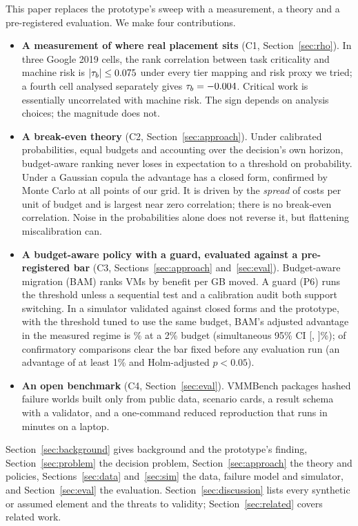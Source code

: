 This paper replaces the prototype's sweep with a measurement, a theory and a pre-registered
evaluation. We make four contributions.

\begin{itemize}
  \item \textbf{A measurement of where real placement sits} (C1, Section~\ref{sec:rho}). In three
  Google 2019 cells, the rank correlation between task criticality and machine risk is
  $|\tau_b| \le 0.075$ under every tier mapping and risk proxy we tried; a fourth
  cell analysed separately gives $\tau_b = -0.004$. Critical work is essentially uncorrelated
  with machine risk. The sign depends on analysis choices; the magnitude does not.

  \item \textbf{A break-even theory} (C2, Section~\ref{sec:approach}). Under calibrated
  probabilities, equal budgets and accounting over the decision's own horizon, budget-aware
  ranking never loses in expectation to a threshold on probability. Under a Gaussian copula the
  advantage has a closed form, confirmed by Monte Carlo at all \VTheoryPoints{} points of our
  grid. It is driven by the \emph{spread} of costs per unit of budget and is largest near zero
  correlation; there is no break-even correlation. Noise in the probabilities alone does not
  reverse it, but flattening miscalibration can.

  \item \textbf{A budget-aware policy with a guard, evaluated against a pre-registered bar}
  (C3, Sections~\ref{sec:approach} and~\ref{sec:eval}). Budget-aware migration (BAM) ranks VMs
  by benefit per GB moved. A guard (P6) runs the threshold unless a sequential test and a
  calibration audit both support switching. In a simulator validated against closed forms and the
  prototype, with the threshold tuned to use the same budget, BAM's adjusted advantage in the
  measured regime is \VDeltaPFourBOneTwo\% at a 2\% budget (simultaneous 95\% CI
  [\VCILoPFourBOneTwo, \VCIHiPFourBOneTwo]\%); \VWins{} of \VFamilySize{} confirmatory comparisons
  clear the bar fixed before any evaluation run (an advantage of at least 1\% and Holm-adjusted
  $p < 0.05$).

  \item \textbf{An open benchmark} (C4, Section~\ref{sec:eval}). VMMBench packages hashed failure
  worlds built only from public data, scenario cards, a result schema with a validator, and a
  one-command reduced reproduction that runs in minutes on a laptop.
\end{itemize}

Section~\ref{sec:background} gives background and the prototype's finding,
Section~\ref{sec:problem} the decision problem, Section~\ref{sec:approach} the theory and
policies, Sections~\ref{sec:data} and~\ref{sec:sim} the data, failure model and simulator, and
Section~\ref{sec:eval} the evaluation. Section~\ref{sec:discussion} lists every synthetic or
assumed element and the threats to validity; Section~\ref{sec:related} covers related work.
